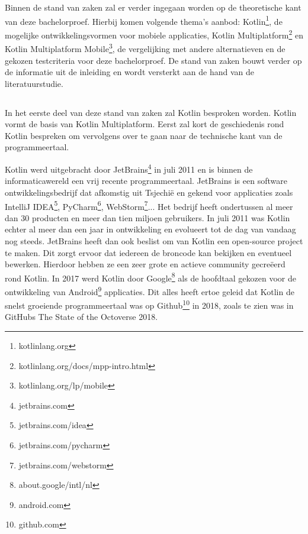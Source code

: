 \chapter{}
\label{ch:stand-van-zaken}

Binnen de stand van zaken zal er verder ingegaan worden op de theoretische kant van deze bachelorproef. Hierbij komen volgende thema's aanbod: Kotlin\footnote{kotlinlang.org}, de mogelijke ontwikkelingsvormen voor mobiele applicaties, Kotlin Multiplatform\footnote{kotlinlang.org/docs/mpp-intro.html} en Kotlin Multiplatform Mobile\footnote{kotlinlang.org/lp/mobile}, de vergelijking met andere alternatieven en de gekozen testcriteria voor deze bachelorproef. De stand van zaken bouwt verder op de informatie uit de inleiding en wordt versterkt aan de hand van de literatuurstudie. 


\section{}
\label{sec:SVZkotlin}

In het eerste deel van deze stand van zaken zal Kotlin besproken worden. Kotlin vormt de basis van Kotlin Multiplatform. Eerst zal kort de geschiedenis rond Kotlin bespreken om vervolgens over te gaan naar de technische kant van de programmeertaal.

Kotlin werd uitgebracht door JetBrains\footnote{jetbrains.com} in juli 2011 en is binnen de informaticawereld een vrij recente programmeertaal.\autocite{Jemerov2011} JetBrains is een software ontwikkelingsbedrijf dat afkomstig uit Tsjechië en gekend voor applicaties zoals IntelliJ IDEA\footnote{jetbrains.com/idea}, PyCharm\footnote{jetbrains.com/pycharm}, WebStorm\footnote{jetbrains.com/webstorm}... Het bedrijf heeft ondertussen al meer dan 30 producten en meer dan tien miljoen gebruikers.\autocite{JetBrains2021} In juli 2011 was Kotlin echter al meer dan een jaar in ontwikkeling en evolueert tot de dag van vandaag nog steeds. JetBrains heeft dan ook beslist om van Kotlin een open-source project te maken. Dit zorgt ervoor dat iedereen de broncode kan bekijken en eventueel bewerken. Hierdoor hebben ze een zeer grote en actieve community gecreëerd rond Kotlin. In 2017 werd Kotlin door Google\footnote{about.google/intl/nl} als de hoofdtaal gekozen voor de ontwikkeling van Android\footnote{android.com} applicaties.\autocite{Shafirov2017} Dit alles heeft ertoe geleid dat Kotlin de snelst groeiende programmeertaal was op Github\footnote{github.com} in 2018, zoals te zien was in GitHubs The State of the Octoverse 2018.\autocite{GitHub2018} 


